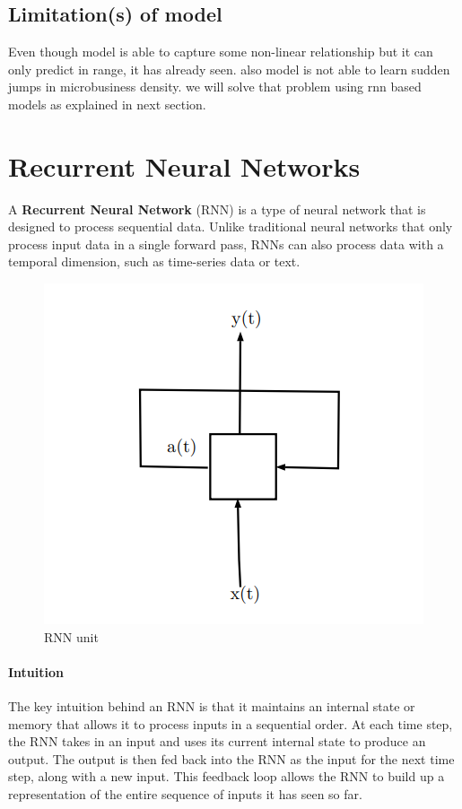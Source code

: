 \documentclass{article}
\begin{document}
\subsection{Limitation(s) of model}

Even though model is able to capture some non-linear relationship but it can only predict in range, it has already seen. also model is not able to learn sudden jumps in microbusiness density. we will solve that problem using rnn based models as explained in next section. 

\vspace{2em}
\section{\centering Recurrent Neural Networks}
\vspace{1em}

A \textbf{Recurrent Neural Network} (RNN) is a type of neural network that is designed to process sequential data. Unlike traditional neural networks that only process input data in a single forward pass, RNNs can also process data with a temporal dimension, such as time-series data or text.

\begin{figure}[h]
	\centering
	\includegraphics[scale=0.8]{images/rnn_unit}
	\caption{RNN unit}
\end{figure}

\paragraph{Intuition} The key intuition behind an RNN is that it maintains an internal state or memory that allows it to process inputs in a sequential order. At each time step, the RNN takes in an input and uses its current internal state to produce an output. The output is then fed back into the RNN as the input for the next time step, along with a new input. This feedback loop allows the RNN to build up a representation of the entire sequence of inputs it has seen so far.
\end{document}
